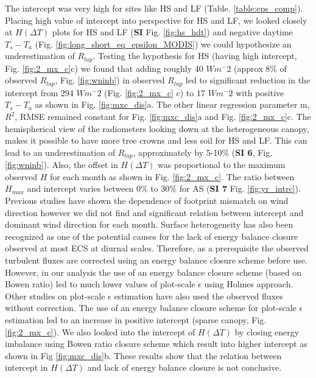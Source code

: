 \documentclass[fleqn,10pt]{wlscirep}
\begin{document}
  	The intercept was very high for sites like HS and LF (Table. \ref{table:eps_comp}). Placing high value of intercept into perspective for HS and LF, we looked closely at $H(\Delta T)$ plots for HS and LF (\textbf{SI} Fig. \ref{fig:hs_hdt}) and negative daytime $T_{s} -T_{a}$ (Fig. \ref{fig:long_short_eq_epsilon_MODIS}) we could hypothesize an underestimation of $R_{lup}$. Testing the hypothesis for HS (having high intercept, Fig. \ref{fig:2_mx_c}c) we found that  adding roughly 40 $Wm^-{2}$ (approx 8\% of observed $R_{lup}$, Fig. \ref{fig:wninb}) in observed $R_{lup}$ led to significant reduction in the intercept from 294 $Wm^-{2}$ (Fig. \ref{fig:2_mx_c} c) to 17 $Wm^-{2}$ with positive $T_{s} - T_{a}$ as shown in Fig. \ref{fig:mxc_dis}a. The other linear regression parameter m, $R^{2}$, RMSE remained constant for Fig. \ref{fig:mxc_dis}a and Fig. \ref{fig:2_mx_c}c. The hemispherical view of the radiometers looking down at the heterogeneous canopy, makes it possible to have more tree crowns and less soil for HS and LF. This can lead to an underestimation of $R_{lup}$, approximately by 5-10$\%$ (\textbf{SI 6}, Fig. \ref{fig:wninb}). Also, the offset in $H(\Delta T)$ was proportional to the maximum observed $H$ for each month as shown in Fig. \ref{fig:2_mx_c}. The ratio between $H_{max}$ and intercept varies between $0\%$ to $30 \%$ for AS (\textbf{SI 7} Fig. \ref{fig:yr_intrc}). Previous studies have shown the dependence of footprint mismatch on wind direction \cite{chu2021representativeness,marcolla2018geometry,morillas2013using} however we did not find and significant relation between intercept and dominant wind direction for each month.
Surface heterogeneity has also been recognized as one of the potential causes for the lack of energy balance closure observed at most ECS \cite{wilson2002energy, stoy2013data} at diurnal scales. Therefore, as a prerequisite the observed turbulent fluxes are corrected using an energy balance closure scheme \cite{foken2008energy} before use. However, in our analysis the use of an energy balance closure scheme (based on Bowen ratio) led to much lower values of plot-scale $\epsilon$ using Holmes approach. Other studies on plot-scale $\epsilon$ estimation have also used the observed fluxes without correction\cite{chen2003surface, holmes_land_2009-1,juang2007separating,maes2019potential}. The use of  an energy balance closure scheme for plot-scale $\epsilon$ estimation led to an increase in positive intercept (sparse canopy, Fig. \ref{fig:2_mx_c}). We also looked into the intercept of $H(\Delta T)$ by closing energy imbalance using Bowen ratio closure scheme \cite{foken2008energy} which result into higher intercept as shown in Fig \ref{fig:mxc_dis}b. These results show that the relation between intercept in $H(\Delta T)$ and lack of energy balance closure is not conclusive.
\end{document}
